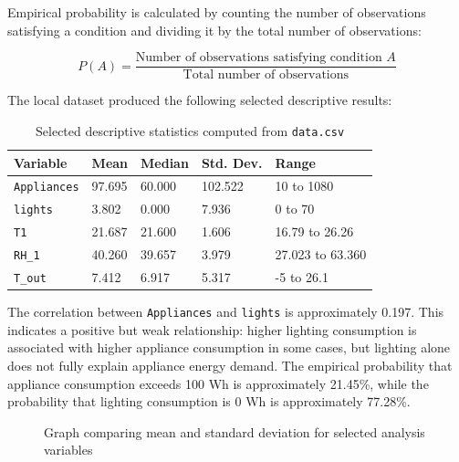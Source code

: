 \documentclass[12pt,a4paper]{article}
\begin{document}
Empirical probability is calculated by counting the number of observations satisfying a condition and dividing it by the total number of observations:

\[
P(A)=\frac{\text{Number of observations satisfying condition } A}{\text{Total number of observations}}
\]

The local dataset produced the following selected descriptive results:

\begin{longtable}{|p{3.2cm}|p{2.2cm}|p{2.2cm}|p{2.2cm}|p{2.2cm}|}
\caption{Selected descriptive statistics computed from \texttt{data.csv}}
\label{tab:descriptive-statistics}\\
\hline
\textbf{Variable} & \textbf{Mean} & \textbf{Median} & \textbf{Std. Dev.} & \textbf{Range} \\
\hline
\texttt{Appliances} & 97.695 & 60.000 & 102.522 & 10 to 1080 \\
\hline
\texttt{lights} & 3.802 & 0.000 & 7.936 & 0 to 70 \\
\hline
\texttt{T1} & 21.687 & 21.600 & 1.606 & 16.79 to 26.26 \\
\hline
\texttt{RH\_1} & 40.260 & 39.657 & 3.979 & 27.023 to 63.360 \\
\hline
\texttt{T\_out} & 7.412 & 6.917 & 5.317 & -5 to 26.1 \\
\hline
\end{longtable}

The correlation between \texttt{Appliances} and \texttt{lights} is approximately 0.197. This indicates a positive but weak relationship: higher lighting consumption is associated with higher appliance consumption in some cases, but lighting alone does not fully explain appliance energy demand. The empirical probability that appliance consumption exceeds 100 Wh is approximately 21.45\%, while the probability that lighting consumption is 0 Wh is approximately 77.28\%.

\begin{figure}[htbp]
\centering
{}
\caption{Graph comparing mean and standard deviation for selected analysis variables}
\label{fig:descriptive-graph}
\end{figure}
\end{document}
